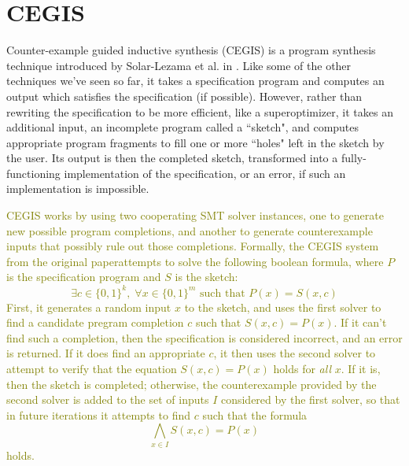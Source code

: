 \documentclass[12pt,twoside]{reedthesis}
\newcommand{\green}[1]{\textcolor{olive}{#1}}
\begin{document}
    \section{CEGIS}
        Counter-example guided inductive synthesis (CEGIS) is a program synthesis technique introduced by Solar-Lezama et al. in \cite{solar-lezama2006sketch}.
        Like some of the other techniques we've seen so far, it takes a specification program and computes an output which satisfies the specification (if possible).
        However, rather than rewriting the specification to be more efficient, like a superoptimizer, it takes an additional input, an incomplete program called a ``sketch", and computes appropriate program fragments to fill one or more ``holes" left in the sketch by the user.
        Its output is then the completed sketch, transformed into a fully-functioning implementation of the specification, or an error, if such an implementation is impossible.
        
        \green{
        CEGIS works by using two cooperating SMT solver instances, one to generate new possible program completions, and another to generate counterexample inputs that possibly rule out those completions.
        Formally, the CEGIS system from the original paper\footnotemark attempts to solve the following boolean formula, where $P$ is the specification program and $S$ is the sketch:
        \[
            \exists c \in \{0,1\}^k,\; \forall x \in \{0,1\}^m \text{ such that } P(x) = S(x,c)
        \]
        First, it generates a random input $x$ to the sketch, and uses the first solver to find a candidate pregram completion $c$ such that $S(x,c) = P(x)$. 
        If it can't find such a completion, then the specification is considered incorrect, and an error is returned.
        If it does find an appropriate $c$, it then uses the second solver to attempt to verify that the equation $S(x,c) = P(x)$ holds for \textit{all} $x$.
        If it is, then the sketch is completed; otherwise, the counterexample provided by the second solver is added to the set of inputs $I$ considered by the first solver, so that in future iterations it attempts to find $c$ such that the formula
        \[
                \bigwedge_{x\in I} S(x, c) = P(x)
        \]
        holds.
        }

        
\end{document}
